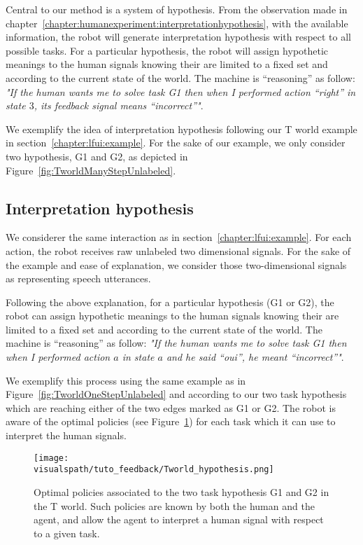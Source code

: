 Central to our method is a system of hypothesis. From the observation made in chapter~\ref{chapter:humanexperiment:interpretationhypothesis}, with the available information, the robot will generate interpretation hypothesis with respect to all possible tasks. For a particular hypothesis, the robot will assign hypothetic meanings to the human signals knowing their are limited to a fixed set and according to the current state of the world. The machine is ``reasoning'' as follow: \emph{"If the human wants me to solve task G1 then when I performed action ``right'' in state $3$, its feedback signal means ``incorrect''"}. 

We exemplify the idea of interpretation hypothesis following our T world example in section~\ref{chapter:lfui:example}. For the sake of our example, we only consider two hypothesis, G1 and G2, as depicted in Figure~\ref{fig:TworldManyStepUnlabeled}.

\subsection{Interpretation hypothesis}

We considerer the same interaction as in section~\ref{chapter:lfui:example}. For each action, the robot receives raw unlabeled two dimensional signals. For the sake of the example and ease of explanation, we consider those two-dimensional signals as representing speech utterances.

Following the above explanation, for a particular hypothesis (G1 or G2), the robot can assign hypothetic meanings to the human signals knowing their are limited to a fixed set and according to the current state of the world. The machine is ``reasoning'' as follow: \emph{"If the human wants me to solve task G1 then when I performed action $a$ in state $a$ and he said ``oui'', he meant ``incorrect''"}. 

We exemplify this process using the same example as in Figure~\ref{fig:TworldOneStepUnlabeled} and according to our two task hypothesis which are reaching either of the two edges marked as G1 or G2. The robot is aware of the optimal policies (see Figure~\ref{fig:Twolrdpolicies}) for each task which it can use to interpret the human signals.

\begin{figure}[!ht]
  \centering
  \texttt{[image: \\visualspath/tuto\_feedback/Tworld\_hypothesis.png]}
  \caption{Optimal policies associated to the two task hypothesis G1 and G2 in the T world. Such policies are known by both the human and the agent, and allow the agent to interpret a human signal with respect to a given task.}
  \label{fig:Twolrdpolicies}
\end{figure}


